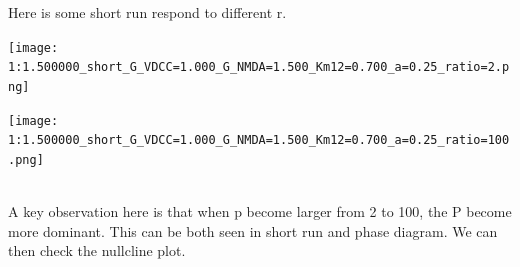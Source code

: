\documentclass{article}
\begin{document}
Here is some short run respond to different r.\\
\begin{minipage}{\textwidth} %
    \centering
    \texttt{[image: 1:1.500000\_short\_G\_VDCC=1.000\_G\_NMDA=1.500\_Km12=0.700\_a=0.25\_ratio=2.png]} %
    \label{fig:a0.25}
\end{minipage}
\begin{minipage}{\textwidth} %
    \centering
    \texttt{[image: 1:1.500000\_short\_G\_VDCC=1.000\_G\_NMDA=1.500\_Km12=0.700\_a=0.25\_ratio=100.png]} %
    \label{fig:a0.25}
\end{minipage}\\
A key observation here is that when p become larger from 2 to 100, the P become more dominant. This can be both seen in short run and phase diagram. We can then check the nullcline plot.
\end{document}
